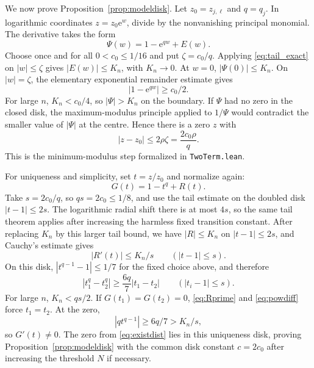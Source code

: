 \documentclass[11pt,reqno]{amsart}
\numberwithin{equation}{section}
\theoremstyle{remark}
\newcommand{\ee}{\mathrm e}
\begin{document}
We now prove Proposition~\ref{prop:modeldisk}.  Let $z_0=z_{j,\ell}$ and $q=q_j$.  In logarithmic coordinates $z=z_0\ee^w$, divide by the nonvanishing principal monomial.  The derivative takes the form
\begin{equation}\label{eq:logmodel}
 \Psi(w)=1-\ee^{qw}+E(w).
\end{equation}
Choose once and for all $0<c_0\le1/16$ and put $\zeta=c_0/q$.  Applying \eqref{eq:tail_exact} on $|w|\le\zeta$ gives $|E(w)|\le K_n$, with $K_n\to0$.  At $w=0$, $|\Psi(0)|\le K_n$.  On $|w|=\zeta$, the elementary exponential remainder estimate gives
\begin{equation}\label{eq:boundarymodel}
 |1-\ee^{qw}|\ge c_0/2.
\end{equation}
For large $n$, $K_n<c_0/4$, so $|\Psi|>K_n$ on the boundary.  If $\Psi$ had no zero in the closed disk, the maximum-modulus principle applied to $1/\Psi$ would contradict the smaller value of $|\Psi|$ at the centre.  Hence there is a zero $z$ with
\begin{equation}\label{eq:existdist}
 |z-z_0|\le 2\rho\zeta=\frac{2c_0\rho}{q}.
\end{equation}
This is the minimum-modulus step formalized in \texttt{TwoTerm.lean}.

For uniqueness and simplicity, set $t=z/z_0$ and normalize again:
\begin{equation}\label{eq:tmodel}
 G(t)=1-t^q+R(t).
\end{equation}
Take $s=2c_0/q$, so $qs=2c_0\le1/8$, and use the tail estimate on the doubled disk $|t-1|\le2s$.  The logarithmic radial shift there is at most $4s$, so the same tail theorem applies after increasing the harmless fixed transition constant.  After replacing $K_n$ by this larger tail bound, we have $|R|\le K_n$ on $|t-1|\le2s$, and Cauchy's estimate gives
\begin{equation}\label{eq:Rprime}
 |R'(t)|\le K_n/s\qquad(|t-1|\le s).
\end{equation}
On this disk, $|t^{q-1}-1|\le1/7$ for the fixed choice above, and therefore
\begin{equation}\label{eq:powdiff}
 |t_1^q-t_2^q|\ge\frac{6q}{7}|t_1-t_2|
 \qquad(|t_i-1|\le s).
\end{equation}
For large $n$, $K_n<qs/2$.  If $G(t_1)=G(t_2)=0$, \eqref{eq:Rprime} and \eqref{eq:powdiff} force $t_1=t_2$.  At the zero,
\[
 |qt^{q-1}|\ge 6q/7>K_n/s,
\]
so $G'(t)\ne0$.  The zero from \eqref{eq:existdist} lies in this uniqueness disk, proving Proposition~\ref{prop:modeldisk} with the common disk constant $c=2c_0$ after increasing the threshold $N$ if necessary.
\end{document}
